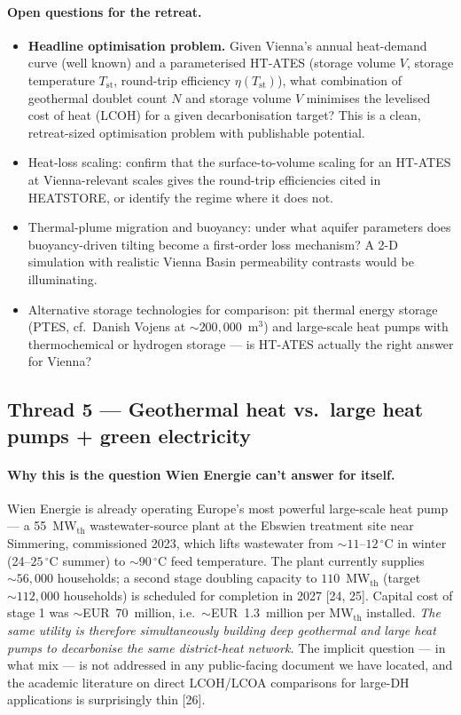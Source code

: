 \documentclass{article}
\begin{document}
\paragraph{Open questions for the retreat.}
\begin{itemize}
\item \textbf{Headline optimisation problem.} Given Vienna's annual
heat-demand curve (well known) and a parameterised HT-ATES (storage
volume $V$, storage temperature $T_{\mathrm{st}}$, round-trip
efficiency $\eta(T_{\mathrm{st}})$), what combination of geothermal
doublet count $N$ and storage volume $V$ minimises the levelised
cost of heat (LCOH) for a given decarbonisation target? This is a
clean, retreat-sized optimisation problem with publishable potential.
\item Heat-loss scaling: confirm that the surface-to-volume scaling
for an HT-ATES at Vienna-relevant scales gives the round-trip
efficiencies cited in HEATSTORE, or identify the regime where it
does not.
\item Thermal-plume migration and buoyancy: under what aquifer
parameters does buoyancy-driven tilting become a first-order loss
mechanism? A 2-D simulation with realistic Vienna Basin permeability
contrasts would be illuminating.
\item Alternative storage technologies for comparison: pit thermal
energy storage (PTES, cf.\ Danish Vojens at $\sim 200{,}000$~m$^3$)
and large-scale heat pumps with thermochemical or hydrogen storage
--- is HT-ATES actually the right answer for Vienna?
\end{itemize}

\subsection*{Thread 5 --- Geothermal heat vs.\ large heat pumps + green electricity}

\paragraph{Why this is the question Wien Energie can't answer for itself.}
Wien Energie is already operating Europe's most powerful large-scale heat
pump --- a 55~MW$_{\mathrm{th}}$ wastewater-source plant at the Ebswien
treatment site near Simmering, commissioned 2023, which lifts wastewater
from $\sim 11$--$12\,^\circ$C in winter (24--$25\,^\circ$C summer) to
$\sim 90\,^\circ$C feed temperature. The plant currently supplies
$\sim 56{,}000$ households; a second stage doubling capacity to
$110$~MW$_{\mathrm{th}}$ (target $\sim 112{,}000$ households) is scheduled
for completion in 2027 [24, 25]. Capital cost of stage 1 was
$\sim$EUR~70~million, i.e.\ $\sim$EUR~1.3~million per MW$_{\mathrm{th}}$
installed. \emph{The same utility is therefore simultaneously building
deep geothermal and large heat pumps to decarbonise the same district-heat
network.} The implicit question --- in what mix --- is not addressed in any
public-facing document we have located, and the academic literature on
direct LCOH/LCOA comparisons for large-DH applications is surprisingly
thin [26].
\end{document}
